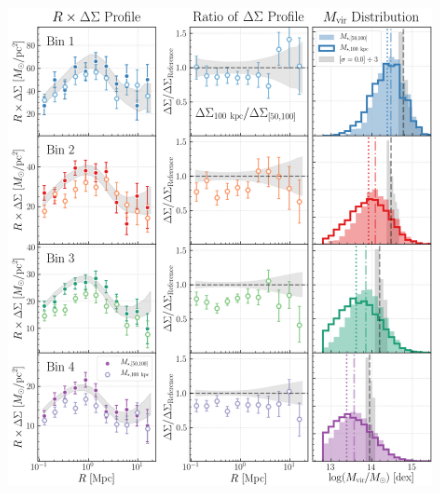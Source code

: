 \documentclass[a4paper,fleqn,usenatbib]{mnras}
\begin{document}
  \begin{figure}
      \centering
      \includegraphics[width=\textwidth]{figure/topn_dsigma_m100_mout_compare}
      \caption{
          }
      \label{fig:m100_mout}
  \end{figure}
\end{document}
